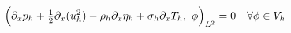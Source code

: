 \documentclass[preview]{standalone}
\newcommand{\dx}{\partial_x}
\begin{document}
\begin{align*}
\special{dvisvgm:raw <g id='unique000'>}\Big(\dx p_h+\tfrac12\dx(u_h^2)-\rho_h\dx\eta_h+\sigma_h\dx T_h,\ \phi\Big)_{L^2}=0\quad\forall\phi\in V_h\special{dvisvgm:raw </g>}
\end{align*}
\end{document}
